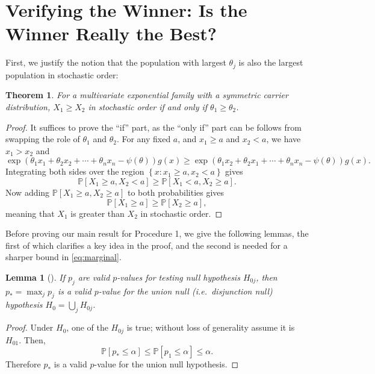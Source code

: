 \documentclass[11pt]{article}
\newtheorem{lemma}[corollary]{Lemma}
\newtheorem{theorem}[corollary]{Theorem}
\theoremstyle{definition}
\theoremstyle{custom}
\newcommand{\PP}{\mathbb{P}}
\begin{document}
\section{Verifying the Winner: Is the Winner Really the Best?}
\label{sec:winnerbest}

First, we justify the notion that the population with largest $\theta_j$ is also the largest population in stochastic order:
\begin{theorem}
For a multivariate exponential family with a symmetric carrier distribution, $X_1 \ge X_2$ in stochastic order if and only if $\theta_1 \geq \theta_2$.
\label{thm:stoch}
\end{theorem}

\begin{proof}
It suffices to prove the ``if'' part, as the ``only if'' part can be follows from swapping the role of $\theta_1$ and $\theta_2$. For any fixed $a$, and $x_1 \ge a$ and $x_2 < a$, we have $x_1 > x_2$ and
$$\exp\left(\theta_1 x_1 + \theta_2 x_2 + \cdots + \theta_n x_n - \psi\left(\theta\right)\right) g\left(x\right) \ge \exp\left(\theta_1 x_2 + \theta_2 x_1 + \cdots + \theta_n x_n - \psi\left(\theta\right)\right) g\left(x\right).$$
Integrating both sides over the region $\left\{x: x_1 \ge a, x_2 < a\right\}$ gives
$$\PP\left[X_1 \ge a, X_2 < a\right] \ge \PP\left[X_1 < a, X_2 \ge a\right].$$
Now adding $\PP\left[X_1 \ge a, X_2 \ge a\right]$ to both probabilities gives
$$\PP\left[X_1 \ge a\right] \ge \PP\left[X_2 \ge a\right],$$
meaning that $X_1$ is greater than $X_2$ in stochastic order.
\end{proof}

Before proving our main result for Procedure 1, we give the following lemmas, the first of which clarifies a key idea in the proof, and the second is needed for a sharper bound in \eqref{eq:marginal}.

\begin{lemma}[\citealp{Berger:1982hy}]
If $p_j$ are valid $p$-values for testing null hypothesis $H_{0j}$, then $p_* = \max_j p_j$ is a valid $p$-value for the union null (i.e.\ disjunction null) hypothesis $H_0 = \bigcup_j H_{0j}$. \label{lma:union}
\end{lemma}

\begin{proof}
Under $H_0$, one of the $H_{0j}$ is true; without loss of generality assume it is $H_{01}$. Then,
$$\PP\left[p_* \le \alpha\right] \le \PP\left[p_1 \le \alpha\right] \le \alpha.$$
Therefore $p_*$ is a valid $p$-value for the union null hypothesis.
\end{proof}
\end{document}

